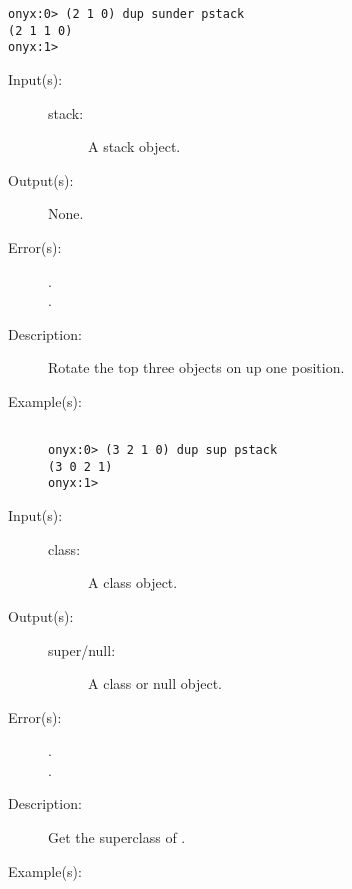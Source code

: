 \begin{description}
\begin{description}
\begin{verbatim}
onyx:0> (2 1 0) dup sunder pstack
(2 1 1 0)
onyx:1>
		\end{verbatim}
	\end{description}
\label{systemdict:sup}
\item[{\onyxop{stack}{sup}{--}}: ]
	\begin{description}\item[]
	\item[Input(s): ]
		\begin{description}\item[]
		\item[stack: ]
			A stack object.
		\end{description}
	\item[Output(s): ] None.
	\item[Error(s): ]
		\begin{description}\item[]
		\item[.]
		\item[.]
		\end{description}
	\item[Description: ]
		Rotate the top three objects on  up one position.
	\item[Example(s): ]\begin{verbatim}

onyx:0> (3 2 1 0) dup sup pstack
(3 0 2 1)
onyx:1>
		\end{verbatim}
	\end{description}
\label{systemdict:super}
\item[{\onyxop{class}{super}{super/null}}: ]
	\begin{description}\item[]
	\item[Input(s): ]
		\begin{description}\item[]
		\item[class: ]
			A class object.
		\end{description}
	\item[Output(s): ]
		\begin{description}\item[]
		\item[super/null: ]
			A class or null object.
		\end{description}
	\item[Error(s): ]
		\begin{description}\item[]
		\item[.]
		\item[.]
		\end{description}
	\item[Description: ]
		Get the superclass of .
	\item[Example(s): ]\begin{verbatim}


\end{verbatim}
\end{description}
\end{description}
